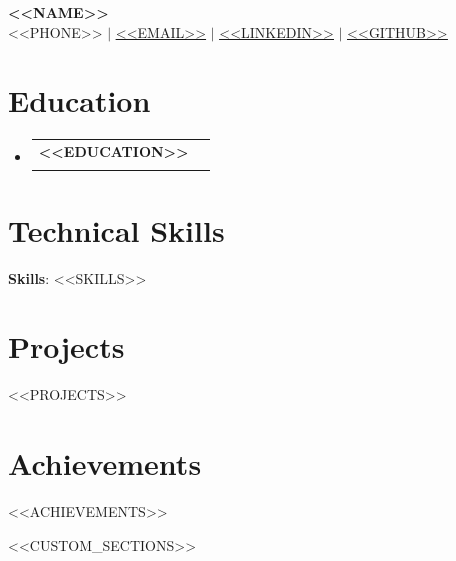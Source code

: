 \documentclass[letterpaper,11pt]{article}
\makeatletter
\newcommand{\resumeSubheading}[4]{\vspace{-2pt}\item\begin{tabular*}{0.97\textwidth}[t]{l@{\extracolsep{\fill}}r}\textbf{#1} & #2 \\\textit{\small#3} & \textit{\small #4} \\\end{tabular*}\vspace{-7pt}}
\newcommand{\resumeSubHeadingListStart}{\begin{itemize}[leftmargin=0.15in, label={}]}
\newcommand{\resumeSubHeadingListEnd}{\end{itemize}}
\newcommand{\resumeItemListStart}{\begin{itemize}}
\newcommand{\resumeItemListEnd}{\end{itemize}\vspace{-5pt}}
\makeatother
\begin{document}
\begin{center}
\textbf{\Huge \scshape <<NAME>>} \\ \vspace{1pt}
\small <<PHONE>> $|$ \href{mailto:<<EMAIL>>}{\underline{<<EMAIL>>}} $|$ 
\href{<<LINKEDIN>>}{\underline{<<LINKEDIN>>}} $|$
\href{<<GITHUB>>}{\underline{<<GITHUB>>}}
\end{center}

\section{Education}
\resumeSubHeadingListStart
\resumeSubheading{<<EDUCATION>>}{}{}{}
\resumeSubHeadingListEnd

\section{Technical Skills}
\begin{itemize}[leftmargin=0.15in, label={}]
\small{\item{\textbf{Skills}{: <<SKILLS>>}}}
\end{itemize}

\section{Projects}
\resumeSubHeadingListStart
<<PROJECTS>>
\resumeSubHeadingListEnd

\section{Achievements}
\resumeItemListStart
<<ACHIEVEMENTS>>
\resumeItemListEnd

<<CUSTOM_SECTIONS>>
\end{document}

